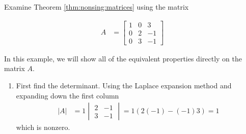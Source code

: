 \begin{example}
Examine Theorem \ref{thm:nonsing:matrices} using the matrix

\begin{align*}
A &= \begin{bmatrix}
1 & 0 & 3 \\
0 & 2 & -1 \\
0 & 3 & -1
\end{bmatrix}
\end{align*}

\solution

In this example, we will show all of the equivalent properties directly on the matrix $A$.

\begin{enumerate}
\item First find the determinant.  Using the Laplace expansion method and expanding down the first column
%
\begin{align*}
|A| & = 1 \begin{vmatrix}
2 & -1 \\ 3 & -1
\end{vmatrix} = 1 (2(-1)-(-1)3) = 1
\end{align*}
which is nonzero.


\end{enumerate}
\end{example}
